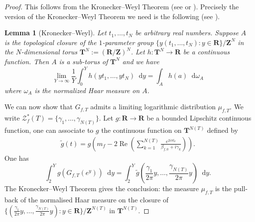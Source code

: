 \documentclass[a4paper,10pt]{amsart}
\theoremstyle{plain}
\newtheorem{lem}[theo]{Lemma}
\theoremstyle{definition}
\begin{document}
\begin{proof} 
This follows from the Kronecker--Weyl Theorem (see \cite[Lem. 2.3]{RS} or \cite[Prop. 2.4]{ANS}).
Precisely the version of the Kronecker--Weyl Theorem we need is the following (see \cite{MOF_KW}).
\begin{lem}[Kronecker--Weyl]\label{Lm_KroneckerWeyl}
Let $t_{1},\ldots,t_{N}$ be arbitrary real numbers.
Suppose $A$ is the topological closure of the $1$-parameter group $\lbrace y(t_{1},\ldots,t_{N}) : y\in\mathbf{R}\rbrace/\mathbf{Z}^{N}$ in the $N$-dimensional torus $\mathbf{T}^{N}:= (\mathbf{R}/\mathbf{Z})^{N}$.
Let $h: \mathbf{T}^{N}\rightarrow \mathbf{R}$ be a continuous function.
Then $A$ is a sub-torus of $\mathbf{T}^{N}$ and we have
\begin{equation}\label{Form_KW}
\lim_{Y\rightarrow\infty}\frac{1}{Y}\int_{0}^{Y}h(yt_{1},\ldots,yt_{N}){\mathop{}\!\mathrm{d}} y
= \int_{A}h(a){\mathop{}\!\mathrm{d}}\omega_{A}
\end{equation}
where $\omega_{A}$ is the normalized Haar measure on $A$.
\end{lem}
We can now show that $G_{f,T}$ admits a limiting logarithmic distribution $\mu_{f,T}$.
We write $\mathcal{Z}_{f}^{*}(T) =\lbrace \gamma_{1},\ldots,\gamma_{N(T)}\rbrace$.
Let $g:\mathbf{R}\rightarrow\mathbf{R}$ be a bounded Lipschitz continuous function,
one can associate to $g$ the continuous function on $\mathbf{T}^{N(T)}$ defined by
\begin{align}\label{form_tilde}
\tilde{g}(t)=  g\left(m_{f} - 2\operatorname{Re}\left(\sum_{k=1}^{N(T)}\frac{e^{2i\pi t_{k}}}{\beta_{f,0}+i\gamma_{k}}\right)\right).
\end{align}
One has 
$$\int_{2}^{Y} g(G_{f,T}(e^{y})){\mathop{}\!\mathrm{d}} y = \int_{2}^{Y} \tilde{g}\left(\frac{\gamma_{1}}{2\pi}y,\ldots,\frac{\gamma_{N(T)}}{2\pi}y\right){\mathop{}\!\mathrm{d}} y.$$
The Kronecker--Weyl Theorem gives the conclusion: 
the measure $\mu_{f,T}$ is the pull-back of the normalised Haar measure on the closure of 
$\lbrace (\frac{\gamma_{1}}{2\pi}y,\ldots,\frac{\gamma_{N(T)}}{2\pi}y) : y\in \mathbf{R}\rbrace/\mathbf{Z}^{N(T)}$ in $\mathbf{T}^{N(T)}$. 
\end{proof}
\end{document}
